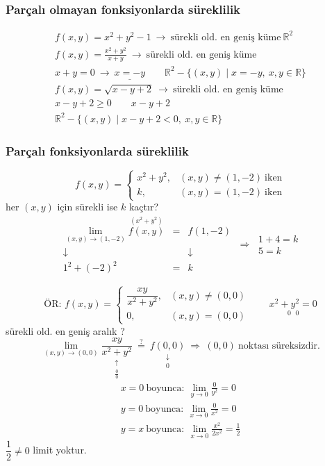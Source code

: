 \documentclass[11pt,a4paper]{article}
\begin{document}
\subsubsection{Parçalı olmayan fonksiyonlarda süreklilik}
\begin{gather*}
f(x,y)=x^2+y^2-1\ \to\ \text{sürekli old. en geniş küme}\ \mathbb{R}^2\\
f(x,y)=\frac{x^2+y^2}{x+y}\ \to\ \text{sürekli old. en geniş küme}\\
x+y=0\ \to\ \underline{x=-y}\qquad\mathbb{R}^2-\{(x,y)\mid x=-y,\ x,y\in\mathbb{R}\}\\
f(x,y)=\sqrt{x-y+2}\ \to\ \text{sürekli old. en geniş küme}\\
x-y+2\ge0\qquad x-y+2\\
\mathbb{R}^2-\{(x,y)\mid x-y+2<0,\ x,y\in\mathbb{R}\}
\end{gather*}

\subsubsection{Parçalı fonksiyonlarda süreklilik}
\[ f(x,y)=\begin{cases}x^2+y^2, & (x,y)\neq(1,-2)\ \text{iken}\\ k, & (x,y)=(1,-2)\ \text{iken}\end{cases} \]
her $(x,y)$ için sürekli ise $k$ kaçtır?
\[ \begin{array}{ccc}\displaystyle\lim_{(x,y)\to(1,-2)}\overset{(x^2+y^2)}{f(x,y)}&=&f(1,-2)\\ \downarrow&&\downarrow\\ 1^2+(-2)^2&=&k\end{array}\ \Longrightarrow\ \begin{array}{l}1+4=k\\ 5=k\end{array} \]

\[ \text{ÖR: }f(x,y)=\begin{cases}\dfrac{xy}{x^2+y^2}, & (x,y)\neq(0,0)\\[2mm] 0, & (x,y)=(0,0)\end{cases}\qquad\underset{0\ \ \ 0}{x^2+y^2=0} \]
sürekli old. en geniş aralık ?
\[ \lim_{(x,y)\to(0,0)}\underset{\substack{\uparrow\\ \tfrac00}}{\frac{xy}{x^2+y^2}}\ \overset{?}{=}\ \underset{\substack{\downarrow\\ 0}}{f(0,0)}\ \Longrightarrow\ (0,0)\ \text{noktası süreksizdir.} \]
\begin{gather*}
x=0\ \text{boyunca}:\ \lim_{y\to0}\frac{0}{y^2}=0\\
y=0\ \text{boyunca}:\ \lim_{x\to0}\frac{0}{x^2}=0\\
y=x\ \text{boyunca}:\ \lim_{x\to0}\frac{x^2}{2x^2}=\frac12
\end{gather*}
$\dfrac12\neq0$ \quad limit yoktur.
\end{document}
